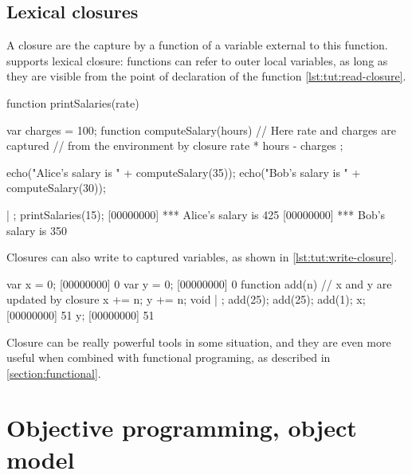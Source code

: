 \section{Lexical closures}

A closure are the capture by a function of a variable external to this
function. \us supports lexical closure: functions can refer to outer
local variables, as long as they are visible from the point of
declaration of the function \autoref{lst:tut:read-closure}.

\begin{urbiscript}[caption=Capturing variables with lexical closures,
label=lst:tut:read-closure]
function printSalaries(rate)
{
  var charges = 100;
  function computeSalary(hours)
  {
    // Here rate and charges are captured
    // from the environment by closure
    rate * hours - charges
  };

  echo("Alice's salary is " + computeSalary(35));
  echo("Bob's salary is " + computeSalary(30));
} | {};
printSalaries(15);
[00000000] *** Alice's salary is 425
[00000000] *** Bob's salary is 350
\end{urbiscript}

Closures can also write to captured variables, as shown in
\autoref{lst:tut:write-closure}.

\begin{urbiscript}[caption=Updating captured variables,
label=lst:tut:write-closure]
var x = 0;
[00000000] 0
var y = 0;
[00000000] 0
function add(n)
{
  // x and y are updated by closure
  x += n;
  y += n;
  void
} | {};
add(25);
add(25);
add(1);
x;
[00000000] 51
y;
[00000000] 51
\end{urbiscript}

Closure can be really powerful tools in some situation, and they are
even more useful when combined with functional programing, as
described in \autoref{section:functional}.


\chapter{Objective programming, \us object model}
\label{section:objective}


